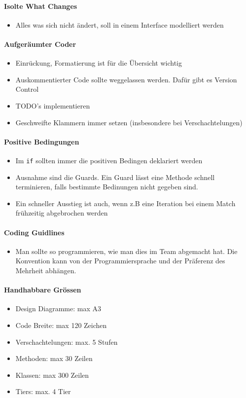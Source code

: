\paragraph{Isolte What Changes}
\begin{itemize}
	\item Alles was sich nicht ändert, soll in einem Interface modelliert werden
\end{itemize}
\paragraph{Aufgeräumter Coder}
\begin{itemize}
	\item Einrückung, Formatierung ist für die Übersicht wichtig
	\item Auskommentierter Code sollte weggelassen werden. Dafür gibt es Version Control
	\item TODO's implementieren
	\item Geschweifte Klammern immer setzen (insbesondere bei Verschachtelungen)
\end{itemize}
\paragraph{Positive Bedingungen}
\begin{itemize}
	\item Im \lstinline|if| sollten immer die positiven Bedingen deklariert werden
	\item Ausnahme sind die Guards. Ein Guard lässt eine Methode schnell terminieren, falls bestimmte Bedinungen nicht gegeben sind.
	\item Ein schneller Ausstieg ist auch, wenn z.B eine Iteration bei einem Match frühzeitig abgebrochen werden
\end{itemize}
\paragraph{Coding Guidlines}
\begin{itemize}
	\item Man sollte so programmieren, wie man dies im Team abgemacht hat. Die Konvention kann von der Programmiersprache und der Präferenz des Mehrheit abhängen.
\end{itemize}
\paragraph{Handhabbare Grössen}
\begin{itemize}
	\item Design Diagramme: max A3
	\item Code Breite: max 120 Zeichen
	\item Verschachtelungen: max. 5 Stufen
	\item Methoden: max 30 Zeilen
	\item Klassen: max 300 Zeilen
	\item Tiers: max. 4 Tier
\end{itemize}
